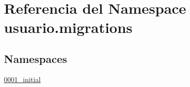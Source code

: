 \hypertarget{namespaceusuario_1_1migrations}{}\section{Referencia del Namespace usuario.\+migrations}
\label{namespaceusuario_1_1migrations}
\subsection*{Namespaces}
\begin{DoxyCompactItemize}
\item 
 \hyperlink{namespaceusuario_1_1migrations_1_10001__initial}{0001\+\_\+initial}
\end{DoxyCompactItemize}
